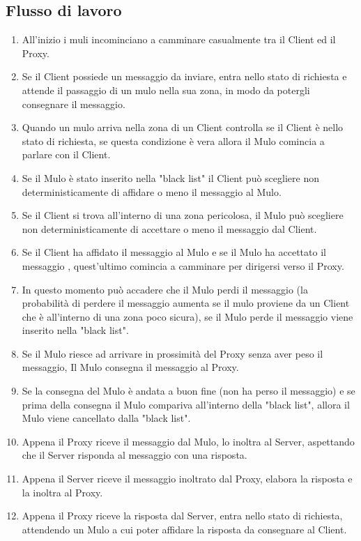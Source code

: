 \documentclass[13pt,a4paper]{article}
\begin{document}
\subsection{Flusso di lavoro}
\begin{enumerate}
	\item All'inizio i muli incominciano a camminare casualmente tra il Client ed il Proxy.
	\item  Se il Client possiede un messaggio da inviare, entra nello stato di richiesta e attende il passaggio di un mulo nella sua zona, in modo da potergli consegnare il messaggio.
	\item Quando un mulo arriva nella zona di un Client controlla se il Client è nello stato di richiesta, se questa condizione è vera allora il Mulo comincia a parlare con il Client.
	\item Se il Mulo è stato inserito nella "black list" il Client può scegliere non deterministicamente di affidare o meno il messaggio al Mulo.
	\item Se il Client si trova all'interno di una zona pericolosa, il Mulo può scegliere non deterministicamente di accettare o meno il messaggio dal Client. 
	\item Se il Client ha affidato il messaggio al Mulo e se il Mulo ha accettato il messaggio , quest'ultimo comincia a camminare per dirigersi verso il Proxy.
	\item In questo momento può accadere che il Mulo perdi il messaggio (la probabilità di perdere il messaggio aumenta se il mulo proviene da un Client che è all'interno di una zona poco sicura), se il Mulo perde il messaggio viene inserito nella "black list".
	\item Se il Mulo riesce ad arrivare in prossimità del Proxy senza aver peso il messaggio, Il Mulo consegna il messaggio al Proxy.
	\item Se la consegna del Mulo è andata a buon fine (non ha perso il messaggio) e se prima della consegna il Mulo compariva all'interno della "black list", allora il Mulo viene cancellato dalla "black list".
	\item Appena il Proxy riceve il messaggio dal Mulo, lo inoltra al Server, aspettando che il Server risponda al messaggio con una risposta.
	\item Appena il Server riceve il messaggio inoltrato dal Proxy, elabora la risposta e la inoltra al Proxy.
	\item Appena il Proxy riceve la risposta dal Server, entra nello stato di richiesta, attendendo un Mulo a cui poter affidare la risposta da consegnare al Client.

\end{enumerate}
\end{document}
